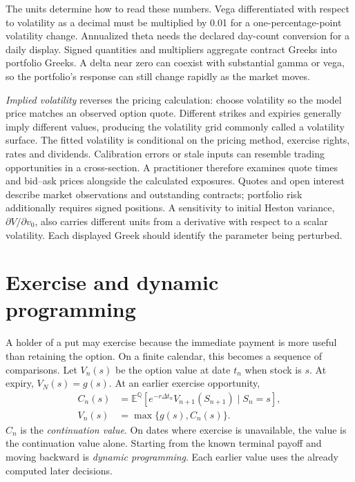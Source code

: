 \documentclass[8pt]{strategynet-journal}
\newcommand{\E}{\mathbb{E}}
\newcommand{\Q}{\mathbb{Q}}
\begin{document}
\begin{SNcolumns}
The units determine how to read these numbers. Vega differentiated with
respect to volatility as a decimal must be multiplied by 0.01 for a
one-percentage-point volatility change. Annualized theta needs the declared
day-count conversion for a daily display. Signed quantities and multipliers
aggregate contract Greeks into portfolio Greeks. A delta near zero can coexist
with substantial gamma or vega, so the portfolio's response can still change
rapidly as the market moves.

\emph{Implied volatility} reverses the pricing calculation: choose volatility
so the model price matches an observed option quote. Different strikes and
expiries generally imply different values, producing the volatility grid
commonly called a volatility surface. The fitted volatility is conditional
on the pricing method, exercise rights, rates and dividends. Calibration
errors or stale inputs can resemble trading opportunities in a cross-section.
A practitioner therefore examines quote times and bid--ask prices alongside
the calculated exposures. Quotes and open interest describe market observations
and outstanding contracts; portfolio risk additionally requires signed positions.
A sensitivity to initial Heston variance, $\partial V/\partial v_0$, also
carries different units from a derivative with respect to a scalar volatility.
Each displayed Greek should identify the parameter being perturbed.

\section{Exercise and dynamic programming}
A holder of a put may exercise because the immediate payment is more useful
than retaining the option. On a finite calendar, this becomes a sequence of
comparisons. Let $V_n(s)$ be the option value at date $t_n$ when stock is $s$.
At expiry, $V_N(s)=g(s)$. At an earlier exercise opportunity,
\[
\begin{aligned}
 C_n(s)&=\E^{\Q}[e^{-r\Delta t_n}V_{n+1}(S_{n+1})\mid S_n=s],\\
 V_n(s)&=\max\{g(s),C_n(s)\}.
\end{aligned}
\]
$C_n$ is the \emph{continuation value}. On dates where exercise is unavailable,
the value is the continuation value alone. Starting from the known terminal
payoff and moving backward is \emph{dynamic programming}. Each earlier value
uses the already computed later decisions.


\end{SNcolumns}
\end{document}
